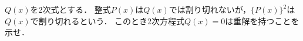 \documentclass[../../main.tex]{subfiles}
\begin{document}
$Q(x)$を2次式とする．
整式$P(x)$は$Q(x)$では割り切れないが，$\{ P(x) \}^2$は$Q(x)$で割り切れるという．
このとき2次方程式$Q(x)=0$は重解を持つことを示せ．
\end{document}
